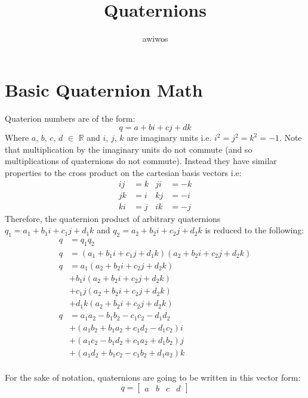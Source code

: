 \documentclass{article}
\title{Quaternions}
\author{awiwos}
\date{}
\begin{document}
\maketitle

\section*{Basic Quaternion Math}
Quaterion numbers are of the form: 
$$q = a + bi + cj + dk$$
Where $a$, $b$, $c$, $d$ $\in$ $\mathbb{R}$ and $i$, $j$, $k$ are imaginary units i.e. $i^2 = j^2 = k^2 = -1$. Note that multiplication by the imaginary units do not commute (and so multiplications of quaternions do not commute). Instead they have similar properties to the cross product on the cartesian basis vectors i.e:
\begin{align*}
    ij &= k & ji &= -k \\
    jk &= i & kj &= -i\\
    ki &= j & ik &= -j
\end{align*}
Therefore, the quaternion product of arbitrary quaternions $q_1 = a_1 + b_1 i + c_1 j + d_1 k$ and $q_2 = a_2 + b_2 i + c_2 j + d_2 k$ is reduced to the following:
\begin{align*}
    q &= q_1 q_2\\
    q &= \left(a_1 + b_1 i + c_1 j + d_1 k\right) \left( a_2 + b_2 i + c_2 j + d_2 k\right)\\
    q &= a_1 \left( a_2 + b_2 i + c_2 j + d_2 k\right) \\
    &+ b_1 i \left( a_2 + b_2 i + c_2 j + d_2 k\right) \\
    &+ c_1 j \left( a_2 + b_2 i + c_2 j + d_2 k\right) \\
    &+ d_1 k \left( a_2 + b_2 i + c_2 j + d_2 k\right) \\
    q &= a_1 a_2 - b_1 b_2 - c_1 c_2 - d_1 d_2 \\
    &+ \left( a_1 b_2 + b_1 a_2 + c_1 d_2 - d_1 c_2\right) i\\
    &+ \left( a_1 c_2 - b_1 d_2 + c_1 a_2 + d_1 b_2\right) j\\
    &+ \left( a_1 d_2 + b_1 c_2 - c_1 b_2 + d_1 a_2\right) k\\
\end{align*}

\noindent
For the sake of notation, quaternions are going to be written in this vector form: $$ q = \begin{bmatrix}a & b & c & d \end{bmatrix} $$
\end{document}
